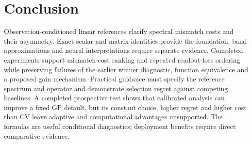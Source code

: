 \section{Conclusion}
Observation-conditioned linear references clarify spectral mismatch costs
and their asymmetry. Exact scalar and matrix identities provide the
foundation; band approximations and neural interpretations require
separate evidence. Completed experiments support mismatch-cost ranking
and repeated readout-loss ordering while preserving failures of the earlier
winner diagnostic, function equivalence and a proposed gain mechanism. Practical
guidance must specify the reference spectrum and operator and demonstrate
selection regret against competing baselines. A completed prospective test
shows that calibrated analysis can improve a fixed GP default, but its
constant choice, higher regret and higher cost than CV leave adaptive and
computational advantages unsupported. The formulas are useful conditional
diagnostics; deployment benefits require direct comparative evidence.
